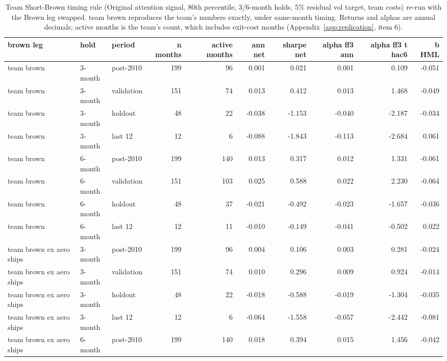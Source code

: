 \begin{table}[H]
\centering\small
\caption{Team Short-Brown timing rule (Original attention signal, 80th percentile, 3/6-month holds, 5\% residual vol target, team costs) re-run with the Brown leg swapped. team brown reproduces the team's numbers exactly, under same-month timing. Returns and alphas are annual decimals; active months is the team's count, which includes exit-cost months (Appendix~\ref{app:replication}, item 6).}
\label{tab:m4_team_rule}
\begin{adjustbox}{max width=\linewidth}
\begin{tabular}{lllrrrrrrr}
\toprule
brown leg & hold & period & n months & active months & ann net & sharpe net & alpha ff3 ann & alpha ff3 t hac6 & b HML \\
\midrule
team brown & 3-month & post-2010 & 199 & 96 & 0.001 & 0.021 & 0.001 & 0.109 & -0.051 \\
team brown & 3-month & validation & 151 & 74 & 0.013 & 0.412 & 0.013 & 1.468 & -0.049 \\
team brown & 3-month & holdout & 48 & 22 & -0.038 & -1.153 & -0.040 & -2.187 & -0.034 \\
team brown & 3-month & last 12 & 12 & 6 & -0.088 & -1.843 & -0.113 & -2.684 & 0.061 \\
team brown & 6-month & post-2010 & 199 & 140 & 0.013 & 0.317 & 0.012 & 1.331 & -0.061 \\
team brown & 6-month & validation & 151 & 103 & 0.025 & 0.588 & 0.022 & 2.230 & -0.064 \\
team brown & 6-month & holdout & 48 & 37 & -0.021 & -0.492 & -0.023 & -1.657 & -0.036 \\
team brown & 6-month & last 12 & 12 & 11 & -0.010 & -0.149 & -0.041 & -0.502 & 0.022 \\
team brown ex aero ships & 3-month & post-2010 & 199 & 96 & 0.004 & 0.106 & 0.003 & 0.281 & -0.024 \\
team brown ex aero ships & 3-month & validation & 151 & 74 & 0.010 & 0.296 & 0.009 & 0.924 & -0.014 \\
team brown ex aero ships & 3-month & holdout & 48 & 22 & -0.018 & -0.588 & -0.019 & -1.304 & -0.035 \\
team brown ex aero ships & 3-month & last 12 & 12 & 6 & -0.064 & -1.558 & -0.057 & -2.442 & -0.081 \\
team brown ex aero ships & 6-month & post-2010 & 199 & 140 & 0.018 & 0.394 & 0.015 & 1.456 & -0.042 \\

\end{tabular}
\end{adjustbox}
\end{table}
